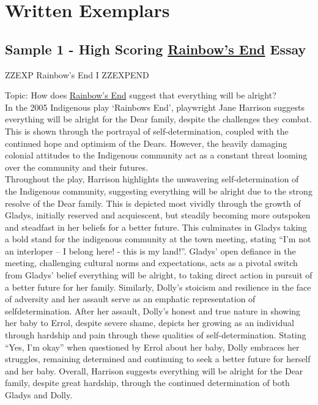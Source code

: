 \documentclass[a4paper]{article}
\begin{document}
\newpage

\section{Written Exemplars}
\subsection{Sample 1 - High Scoring \underline{Rainbow's End} Essay}


ZZEXP Rainbow's End I ZZEXPEND



Topic:
How does \underline{Rainbow’s End} suggest that everything will be alright?\\


In the 2005 Indigenous play ‘Rainbows End’, playwright Jane Harrison suggests everything will be
alright for the Dear family, despite the challenges they combat. This is shown through the portrayal
of self-determination, coupled with the continued hope and optimism of the Dears. However, the
heavily damaging colonial attitudes to the Indigenous community act as a constant threat looming
over the community and their futures.\\

Throughout the play, Harrison highlights the unwavering self-determination of the Indigenous
community, suggesting everything will be alright due to the strong resolve of the Dear family. This is
depicted most vividly through the growth of Gladys, initially reserved and acquiescent, but steadily
becoming more outspoken and steadfast in her beliefs for a better future. This culminates in Gladys
taking a bold stand for the indigenous community at the town meeting, stating “I’m not an
interloper – I belong here! - this is my land!”. Gladys’ open defiance in the meeting, challenging
cultural norms and expectations, acts as a pivotal switch from Gladys’ belief everything will be
alright, to taking direct action in pursuit of a better future for her family. Similarly, Dolly’s stoicism
and resilience in the face of adversity and her assault serve as an emphatic representation of selfdetermination.
After her assault, Dolly’s honest and true nature in showing her baby to Errol, despite
severe shame, depicts her growing as an individual through hardship and pain through these
qualities of self-determination. Stating “Yes, I’m okay” when questioned by Errol about her baby,
Dolly embraces her struggles, remaining determined and continuing to seek a better future for
herself and her baby. Overall, Harrison suggests everything will be alright for the Dear family, despite
great hardship, through the continued determination of both Gladys and Dolly.\\
\end{document}
